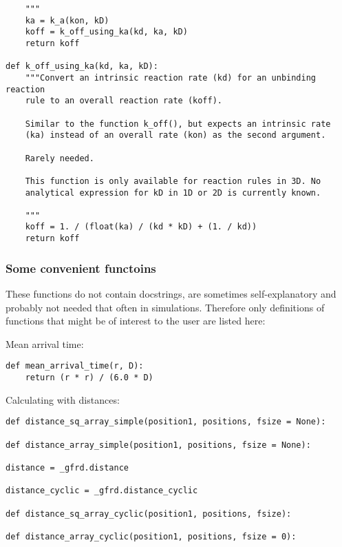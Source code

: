 \documentclass[a4paper,10pt]{article}
\begin{document}
\begin{verbatim}
    """
    ka = k_a(kon, kD) 
    koff = k_off_using_ka(kd, ka, kD)
    return koff

def k_off_using_ka(kd, ka, kD):
    """Convert an intrinsic reaction rate (kd) for an unbinding reaction 
    rule to an overall reaction rate (koff).

    Similar to the function k_off(), but expects an intrinsic rate 
    (ka) instead of an overall rate (kon) as the second argument.

    Rarely needed.

    This function is only available for reaction rules in 3D. No 
    analytical expression for kD in 1D or 2D is currently known. 

    """
    koff = 1. / (float(ka) / (kd * kD) + (1. / kd))
    return koff
\end{verbatim}


\subsubsection{Some convenient functoins}

These functions do not contain docstrings, are sometimes self-explanatory and probably not needed that often in simulations. Therefore only definitions of functions that might be of interest to the user are listed here:

Mean arrival time:
\begin{verbatim}
def mean_arrival_time(r, D):
    return (r * r) / (6.0 * D)
\end{verbatim}

Calculating with distances:
\begin{verbatim}
def distance_sq_array_simple(position1, positions, fsize = None):
    
def distance_array_simple(position1, positions, fsize = None):

distance = _gfrd.distance

distance_cyclic = _gfrd.distance_cyclic

def distance_sq_array_cyclic(position1, positions, fsize):
    
def distance_array_cyclic(position1, positions, fsize = 0):

\end{verbatim}
\end{document}
